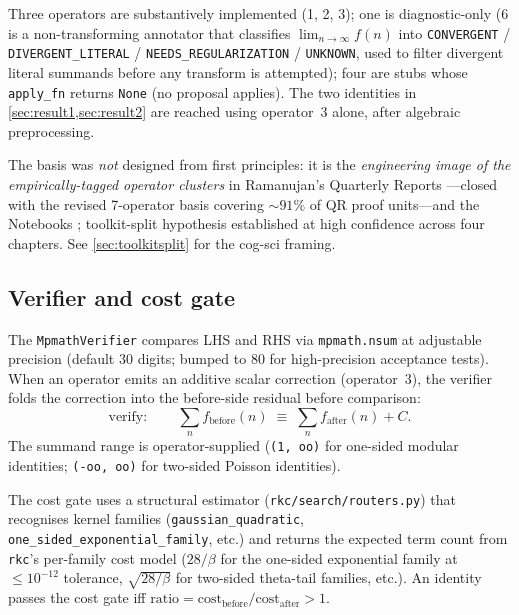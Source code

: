 \documentclass[11pt,reqno]{amsart}
\theoremstyle{definition}
\begin{document}
Three operators are substantively implemented (1, 2, 3); one is
diagnostic-only (6 is a non-transforming annotator that classifies
$\lim_{n \to \infty} f(n)$ into
\verb|CONVERGENT| / \verb|DIVERGENT_LITERAL| /
\verb|NEEDS_REGULARIZATION| / \verb|UNKNOWN|, used to filter
divergent literal summands before any transform is attempted); four
are stubs whose \verb|apply_fn| returns \verb|None| (no proposal
applies). The two identities in \cref{sec:result1,sec:result2} are
reached using operator~3 alone, after algebraic preprocessing.

The basis was \emph{not} designed from first principles: it is the
\emph{engineering image of the empirically-tagged operator clusters}
in Ramanujan's Quarterly Reports
\cite[Hunt~5, diary~20]{ProjectC}---closed with the revised
7-operator basis covering $\sim 91\%$ of QR proof units---and the
Notebooks \cite[Hunt~5b, diaries~22, 24, 25, 36]{ProjectC};
toolkit-split hypothesis established at high confidence across four
chapters. See \cref{sec:toolkitsplit} for the cog-sci framing.

\subsection{Verifier and cost gate}\label{sec:verifier}

The \verb|MpmathVerifier| compares LHS and RHS via \verb|mpmath.nsum|
at adjustable precision (default $30$ digits; bumped to $80$ for
high-precision acceptance tests). When an operator emits an additive
scalar correction (operator~3), the verifier folds the correction
into the before-side residual before comparison:
\begin{equation*}
\text{verify}: \qquad
\sum_n f_{\text{before}}(n) \;\equiv\; \sum_n f_{\text{after}}(n) + C.
\end{equation*}
The summand range is operator-supplied (\verb|(1, oo)| for one-sided
modular identities; \verb|(-oo, oo)| for two-sided Poisson
identities).

The cost gate uses a structural estimator
(\verb|rkc/search/routers.py|) that recognises kernel families
(\verb|gaussian_quadratic|, \verb|one_sided_exponential_family|,
etc.) and returns the expected term count from \texttt{rkc}'s
per-family cost model ($28/\beta$ for the one-sided exponential
family at $\le 10^{-12}$ tolerance, $\sqrt{28/\beta}$ for two-sided
theta-tail families, etc.). An identity passes the cost gate iff
$\text{ratio} = \text{cost}_{\text{before}} / \text{cost}_{\text{after}} > 1$.
\end{document}
